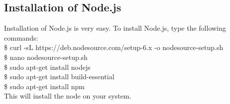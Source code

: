 \subsection{Installation of Node.js}
Installation of Node.js is very easy. To install Node.js,
type the following commands:\\

	\$ curl -sL https://deb.nodesource.com/setup-6.x -o nodesource-setup.sh\\


	\$ nano nodesource-setup.sh\\


	\$ sudo apt-get install nodejs\\


	\$ sudo apt-get install build-essential\\


	\$ sudo apt-get install npm \\

\noindent This will install the node on your system.

